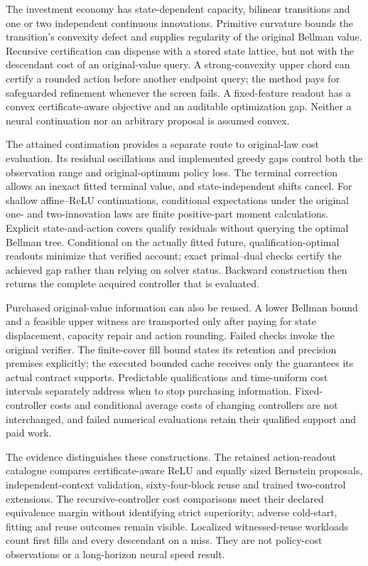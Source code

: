 \documentclass[ecta,nameyear,draft]{econsocart}
\begin{document}
The investment economy has state-dependent capacity, bilinear transitions and one or two independent continuous innovations. Primitive curvature bounds the transition's convexity defect and supplies regularity of the original Bellman value. Recursive certification can dispense with a stored state lattice, but not with the descendant cost of an original-value query. A strong-convexity upper chord can certify a rounded action before another endpoint query; the method pays for safeguarded refinement whenever the screen fails. A fixed-feature readout has a convex certificate-aware objective and an auditable optimization gap. Neither a neural continuation nor an arbitrary proposal is assumed convex.

The attained continuation provides a separate route to original-law cost evaluation. Its residual oscillations and implemented greedy gaps control both the observation range and original-optimum policy loss. The terminal correction allows an inexact fitted terminal value, and state-independent shifts cancel. For shallow affine--ReLU continuations, conditional expectations under the original one- and two-innovation laws are finite positive-part moment calculations. Explicit state-and-action covers qualify residuals without querying the optimal Bellman tree. Conditional on the actually fitted future, qualification-optimal readouts minimize that verified account; exact primal--dual checks certify the achieved gap rather than relying on solver status. Backward construction then returns the complete acquired controller that is evaluated.

Purchased original-value information can also be reused. A lower Bellman bound and a feasible upper witness are transported only after paying for state displacement, capacity repair and action rounding. Failed checks invoke the original verifier. The finite-cover fill bound states its retention and precision premises explicitly; the executed bounded cache receives only the guarantees its actual contract supports. Predictable qualifications and time-uniform cost intervals separately address when to stop purchasing information. Fixed-controller costs and conditional average costs of changing controllers are not interchanged, and failed numerical evaluations retain their qualified support and paid work.

The evidence distinguishes these constructions. The retained action-readout catalogue compares certificate-aware ReLU and equally sized Bernstein proposals, independent-context validation, sixty-four-block reuse and trained two-control extensions. The recursive-controller cost comparisons meet their declared equivalence margin without identifying strict superiority; adverse cold-start, fitting and reuse outcomes remain visible. Localized witnessed-reuse workloads count first fills and every descendant on a miss. They are not policy-cost observations or a long-horizon neural speed result.
\end{document}
